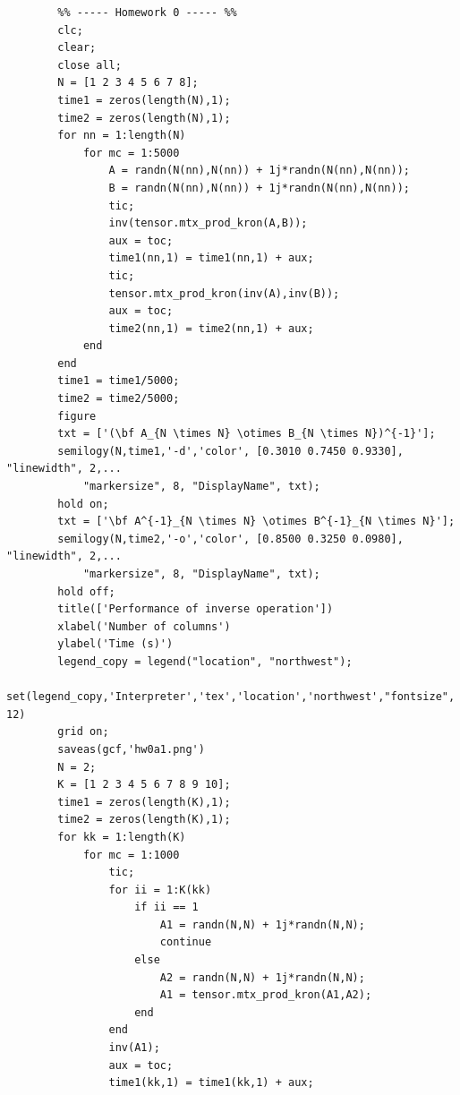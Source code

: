 \documentclass[a4paper,10pt]{article}
\begin{document}
    \begin{verbatim}
        %% ----- Homework 0 ----- %%
        clc;
        clear;
        close all;
        N = [1 2 3 4 5 6 7 8];
        time1 = zeros(length(N),1);
        time2 = zeros(length(N),1);
        for nn = 1:length(N)
            for mc = 1:5000
                A = randn(N(nn),N(nn)) + 1j*randn(N(nn),N(nn));
                B = randn(N(nn),N(nn)) + 1j*randn(N(nn),N(nn));
                tic;
                inv(tensor.mtx_prod_kron(A,B));
                aux = toc;
                time1(nn,1) = time1(nn,1) + aux;
                tic;
                tensor.mtx_prod_kron(inv(A),inv(B));
                aux = toc;
                time2(nn,1) = time2(nn,1) + aux;
            end
        end
        time1 = time1/5000;
        time2 = time2/5000;
        figure
        txt = ['(\bf A_{N \times N} \otimes B_{N \times N})^{-1}'];
        semilogy(N,time1,'-d','color', [0.3010 0.7450 0.9330], "linewidth", 2,...
            "markersize", 8, "DisplayName", txt);
        hold on;
        txt = ['\bf A^{-1}_{N \times N} \otimes B^{-1}_{N \times N}'];
        semilogy(N,time2,'-o','color', [0.8500 0.3250 0.0980], "linewidth", 2,...
            "markersize", 8, "DisplayName", txt);
        hold off;
        title(['Performance of inverse operation'])
        xlabel('Number of columns')
        ylabel('Time (s)')
        legend_copy = legend("location", "northwest");
        set(legend_copy,'Interpreter','tex','location','northwest',"fontsize", 12)
        grid on;
        saveas(gcf,'hw0a1.png')
        N = 2;
        K = [1 2 3 4 5 6 7 8 9 10];
        time1 = zeros(length(K),1);
        time2 = zeros(length(K),1);
        for kk = 1:length(K)
            for mc = 1:1000
                tic;
                for ii = 1:K(kk)    
                    if ii == 1
                        A1 = randn(N,N) + 1j*randn(N,N); 
                        continue
                    else
                        A2 = randn(N,N) + 1j*randn(N,N);
                        A1 = tensor.mtx_prod_kron(A1,A2);
                    end    
                end
                inv(A1);
                aux = toc;
                time1(kk,1) = time1(kk,1) + aux;
                

\end{verbatim}
\end{document}
